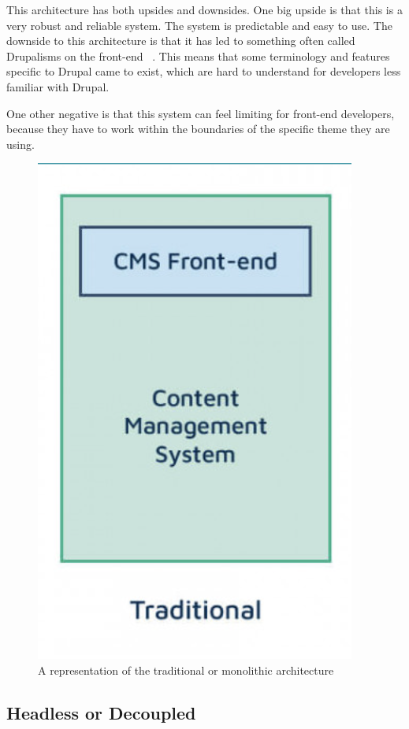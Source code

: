 This architecture has both upsides and downsides. One big upside is that this is a very robust and reliable system. The system is predictable and easy to use. The downside to this architecture is that it has led to something often called Drupalisms on the front-end ~\autocite{So2018}. This means that some terminology and features specific to Drupal came to exist, which are hard to understand for developers less familiar with Drupal. 

One other negative is that this system can feel limiting for front-end developers, because they have to work within the boundaries of the specific theme they are using.

\begin{figure}
\centering
\includegraphics{./img/Traditional_Architecture}
\caption[Traditional CMS architecture]{A representation of the traditional or monolithic architecture ~\autocite{Dropsolid2021}}
\end{figure}

\subsection{Headless or Decoupled}


